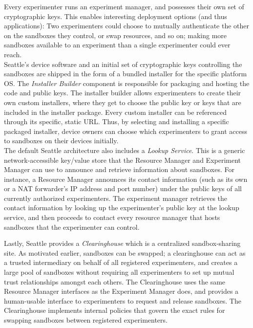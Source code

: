 Every experimenter runs an experiment manager, and possesses
their own set of cryptographic keys. This enables interesting
deployment options (and thus applications):
Two experimenters could choose to mutually authenticate the
other on the sandboxes they control, or swap resources, and
so on; making more sandboxes available to an experiment than
a single experimenter could ever reach.
\\

Seattle's device software and an initial set of cryptographic
keys controlling the sandboxes are shipped in the form of a bundled
installer for the specific platform \gls{OS}.
The \textit{Installer Builder} component is responsible for
packaging and hosting the code and public keys.
The installer builder allows experimenters to create their own
custom installers, where they get to choose the public key or keys
that are included in the installer package. Every custom installer
can be referenced through its specific, static \gls{URL}.
Thus, by selecting and installing a specific packaged installer,
device owners can choose which experimenters to grant
access to sandboxes on their devices initially.
\\


The default Seattle architecture also includes a
\textit{Lookup Service}. This is a generic network-accessible
key/value store that the Resource Manager and Experiment Manager
can use to announce and retrieve information about sandboxes.
For instance, a Resource Manager announces its contact information
(such as its own or a \gls{NAT} forwarder's \gls{IP} address and port number) under
the public keys of all currently authorized experimenters.
The experiment manager retrieves the contact information by looking up
the experimenter's public key at the lookup service, and then
proceeds to contact every resource manager that hosts sandboxes
that the experimenter can control.

Lastly, Seattle provides a \textit{Clearinghouse} which is a
centralized sandbox-sharing site. As motivated earlier,
sandboxes can be swapped; a clearinghouse can act as a trusted
intermediary on behalf of all registered experimenters, and creates
a large pool of sandboxes without requiring all experimenters to
set up mutual trust relationships amongst each others.
The Clearinghouse uses the same Resource Manager interfaces as the
Experiment Manager does, and provides a human-usable interface to
experimenters to request and release sandboxes.
The Clearinghouse implements internal policies
that govern the exact rules for swapping sandboxes between
registered experimenters.

